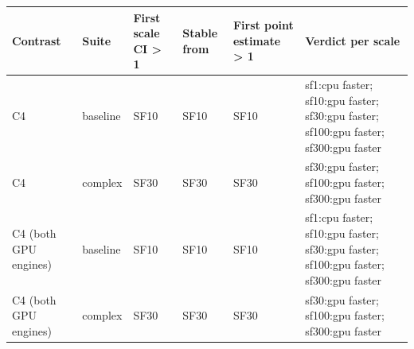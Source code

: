 \begin{tabular}{llllll}
\toprule
Contrast & Suite & First scale CI > 1 & Stable from & First point estimate > 1 & Verdict per scale \\
\midrule
C4 & baseline & SF10 & SF10 & SF10 & sf1:cpu faster; sf10:gpu faster; sf30:gpu faster; sf100:gpu faster; sf300:gpu faster \\
C4 & complex & SF30 & SF30 & SF30 & sf30:gpu faster; sf100:gpu faster; sf300:gpu faster \\
C4 (both GPU engines) & baseline & SF10 & SF10 & SF10 & sf1:cpu faster; sf10:gpu faster; sf30:gpu faster; sf100:gpu faster; sf300:gpu faster \\
C4 (both GPU engines) & complex & SF30 & SF30 & SF30 & sf30:gpu faster; sf100:gpu faster; sf300:gpu faster \\
\bottomrule
\end{tabular}

